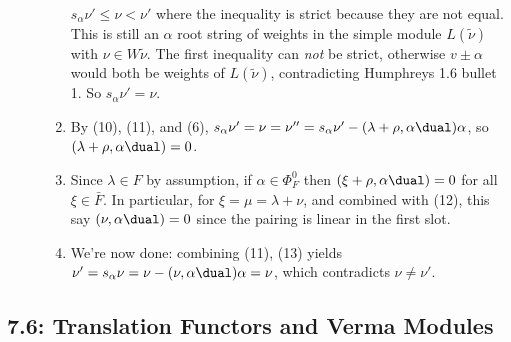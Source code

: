 \begin{description}
\begin{enumerate}
  \(s_\alpha \nu ' \leq \nu < \nu'\) where the inequality is strict
  because they are not equal. This is still an \(\alpha\) root string of
  weights in the simple module \(L(\tilde \nu)\) with
  \(\nu \in W\tilde \nu\). The first inequality can \emph{not} be
  strict, otherwise \(v\pm \alpha\) would both be weights of
  \(L(\tilde \nu)\), contradicting Humphreys 1.6 bullet 1. So
  \(s_\alpha \nu' = \nu\).
\item
  By (10), (11), and (6),
  \(s_\alpha \nu' = \nu = \nu'' = s_\alpha \nu ' - (\lambda + \rho, \alpha\dual) \alpha\),
  so \((\lambda + \rho, \alpha\dual) = 0\).
\item
  Since \(\lambda \in F\) by assumption, if \(\alpha \in \Phi_F^0\) then
  \((\xi + \rho, \alpha\dual) = 0\) for all \(\xi \in \bar F\). In
  particular, for \(\xi = \mu = \lambda + \nu\), and combined with (12),
  this say \((\nu, \alpha\dual) = 0\) since the pairing is linear in the
  first slot.
\item
  We're now done: combining (11), (13) yields
  \(\nu ' = s_\alpha \nu = \nu - (\nu, \alpha\dual)\alpha = \nu\), which
  contradicts \(\nu \neq \nu'\).
\end{enumerate}
\end{description}

\hypertarget{translation-functors-and-verma-modules}{%
\subsection{7.6: Translation Functors and Verma
Modules}\label{translation-functors-and-verma-modules}}

